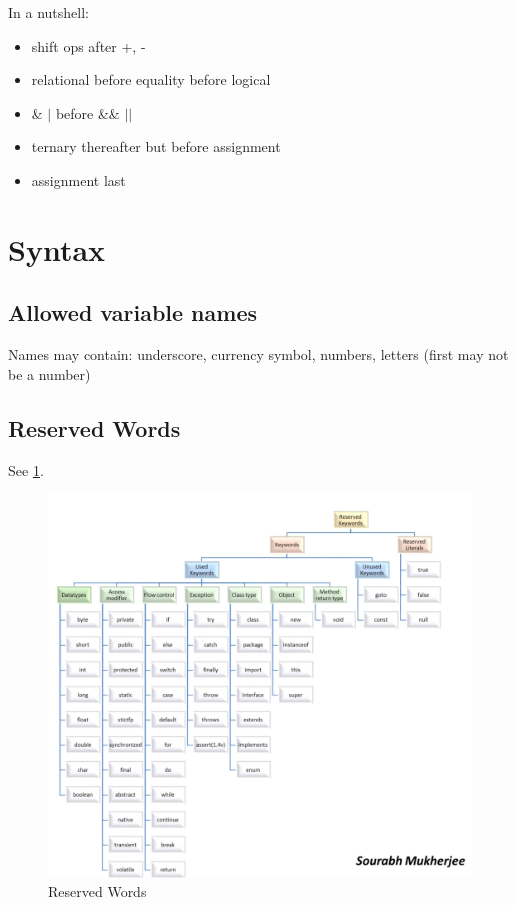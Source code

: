 \documentclass{scrartcl}
\begin{document}
    In a nutshell:

    \begin{itemize}
        \item shift ops after +, -
        \item relational before equality before logical
        \item \& $|$ before \&\& $||$
        \item ternary thereafter but before assignment
        \item assignment last
    \end{itemize}

\section{Syntax}
\subsection{Allowed variable names}

    Names may contain: underscore, currency symbol, numbers, letters (first may not be a number)

\subsection{Reserved Words}

    See \ref{fig:reserved-words}.

    \begin{figure}
        \centering
        \includegraphics[width=1\linewidth]{reserved-words}
        \caption{Reserved Words}
        \label{fig:reserved-words}
    \end{figure}
\end{document}
